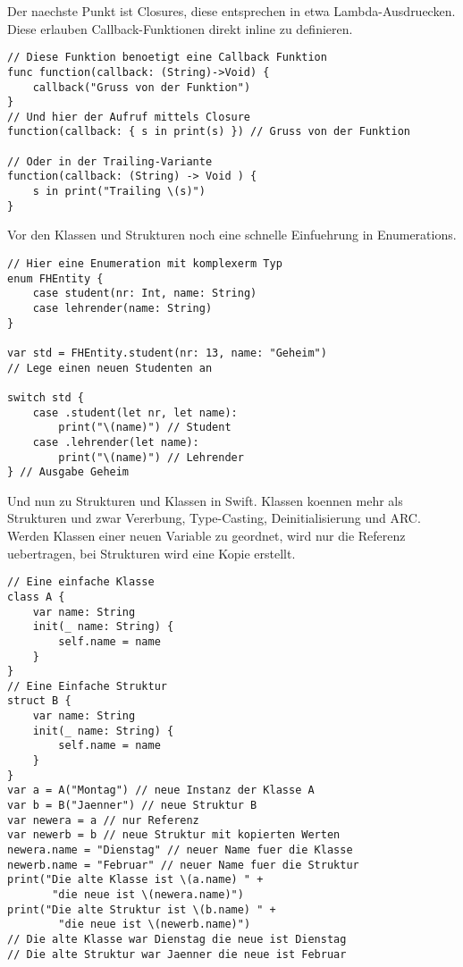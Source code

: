 Der naechste Punkt ist Closures, diese entsprechen in etwa Lambda-Ausdruecken. Diese erlauben Callback-Funktionen direkt inline zu definieren.
\begin{lstlisting}
// Diese Funktion benoetigt eine Callback Funktion
func function(callback: (String)->Void) {
	callback("Gruss von der Funktion")
}
// Und hier der Aufruf mittels Closure
function(callback: { s in print(s) }) // Gruss von der Funktion

// Oder in der Trailing-Variante
function(callback: (String) -> Void ) {
	s in print("Trailing \(s)")
}
\end{lstlisting}
Vor den Klassen und  Strukturen noch eine schnelle Einfuehrung in  Enumerations.
\begin{lstlisting}
// Hier eine Enumeration mit komplexerm Typ
enum FHEntity {
    case student(nr: Int, name: String) 
    case lehrender(name: String)
}

var std = FHEntity.student(nr: 13, name: "Geheim") 
// Lege einen neuen Studenten an

switch std {
    case .student(let nr, let name):
        print("\(name)") // Student
    case .lehrender(let name):
        print("\(name)") // Lehrender
} // Ausgabe Geheim
\end{lstlisting}
Und nun zu Strukturen und Klassen in Swift. Klassen koennen mehr als Strukturen und zwar Vererbung, Type-Casting, Deinitialisierung und ARC. Werden Klassen einer neuen Variable zu geordnet, wird nur die Referenz uebertragen, bei Strukturen wird eine Kopie erstellt.
\begin{lstlisting}
// Eine einfache Klasse
class A {
    var name: String
    init(_ name: String) {
        self.name = name
    }
}
// Eine Einfache Struktur
struct B {
    var name: String
    init(_ name: String) {
        self.name = name
    }
}
var a = A("Montag") // neue Instanz der Klasse A
var b = B("Jaenner") // neue Struktur B
var newera = a // nur Referenz
var newerb = b // neue Struktur mit kopierten Werten
newera.name = "Dienstag" // neuer Name fuer die Klasse
newerb.name = "Februar" // neuer Name fuer die Struktur
print("Die alte Klasse ist \(a.name) " +
       "die neue ist \(newera.name)")
print("Die alte Struktur ist \(b.name) " +
        "die neue ist \(newerb.name)")
// Die alte Klasse war Dienstag die neue ist Dienstag
// Die alte Struktur war Jaenner die neue ist Februar
\end{lstlisting}
